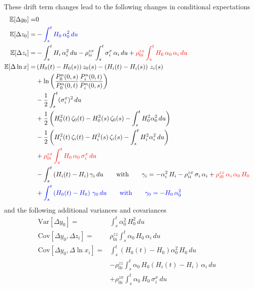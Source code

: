 \documentclass[12pt, a4paper]{article}
\newcommand\E{\ensuremath{\mathbb{E}}}
\begin{document}
{{\begin{appendix}
These drift term changes lead to the following changes in conditional expectations 
\begin{align*}
\E[\Delta y_0] =& 0 \\
\E[\Delta z_0] =& - {\color{blue}\int_s^t H_0\,\alpha_0^2\,du}  \\
\E[\Delta z_i] =& - \int_s^t H_i\,\alpha_i^2\,du 
  - \rho^{zx}_{ii}\int_s^t \sigma_i^x\,\alpha_i\,du
  + {\color{red}\rho^{zz}_{0i} \int_s^t H_0\,\alpha_0\,\alpha_i\,du } \\
\E[\Delta \ln x] 
  =& \left(H_0(t)-H_0(s)\right) z_0(s) -\left(H_i(t)-H_i(s)\right)\,z_i(s)\\
  &+ \ln \left( \frac{P^n_0(0,s)}{P^n_0(0,t)} \frac{P^n_i(0,t)}{P^n_i(0,s)}\right) \\
  & - \frac12 \int_s^t (\sigma^x_i)^2\,du \\
  &+\frac12 \left(H^2_0(t)\, \zeta_0(t) -  H^2_0(s) \,\zeta_0(s) - \int_s^t H_0^2 \alpha_0^2\,du\right)\\
  &-\frac12 \left(H^2_i(t) \,\zeta_i(t) -  H^2_i(s) \,\zeta_i(s) - \int_s^t H_i^2 \alpha_i^2\,du\right)\\
  & + {\color{red} \rho^{zx}_{0i} \int_s^t H_0\, \alpha_0\, \sigma^x_i\,du} \\
  &  - \int_s^t \left(H_i(t)-H_i\right)\gamma_i \,du \qquad\mbox{with}\qquad
  \gamma_i = -\alpha_i^2\,H_i -\rho_{ii}^{zx}\,\sigma_i\,\alpha_i + {\color{red}\rho_{i0}^{zz}\,\alpha_i\,\alpha_0\,H_0}   \\
  & + {\color{blue}\int_s^t \left(H_0(t)-H_0\right)\,\gamma_0 \,du \qquad \mbox{with}\qquad \gamma_0 = - H_0\,\alpha_0^2}
\end{align*}
and the following additional variances and covariances
\begin{align*}
\mathrm{Var}[\Delta y_0] =& \int_s^t \alpha_0^2\,H_0^2\,du \\
\mathrm{Cov}[\Delta y_0, \Delta z_i] =& \rho^{zz}_{0i} \int_s^t \alpha_0\,H_0\,\alpha_i\,du \\
\mathrm{Cov}[\Delta y_0, \Delta \ln x_i] =& \int_s^t \left(H_0(t)-H_0\right) \alpha_0^2\,H_0\,du \\
&  - \rho^{zz}_{0i}\int_s^t \alpha_0\,H_0\left(H_i(t)-H_i\right)\, \alpha_i \,du \\
&  +\rho^{zx}_{0i}\int_s^t \alpha_0 \, H_0\,\sigma^x_i \,du 

\end{align*}
\end{appendix}}}
\end{document}
